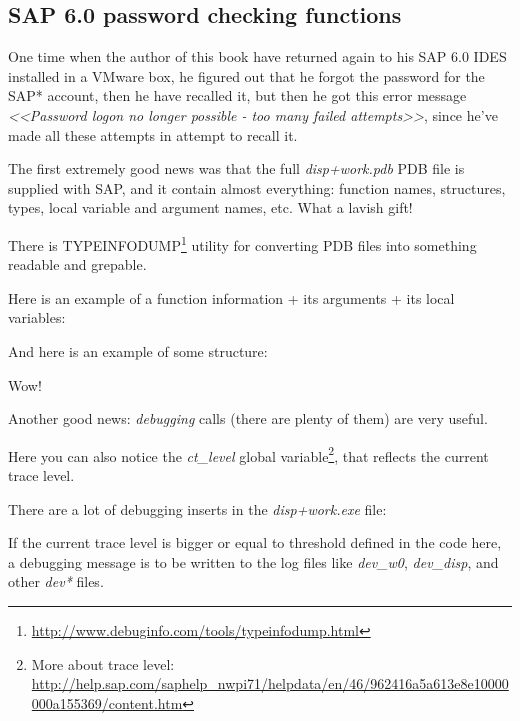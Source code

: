 \subsection{SAP 6.0 password checking functions}


One time when the author of this book have returned again to his SAP 6.0 IDES installed in a VMware box, he figured out that he forgot the password for the SAP* account, then he have recalled it, but then he got this error message 
\emph{<<Password logon no longer possible - too many failed attempts>>}, 
since he've made all these attempts in attempt to recall it.


The first extremely good news was that the full \emph{disp+work.pdb} \gls{PDB} file is supplied with SAP, and it contain almost everything: function names, structures, types, local variable and argument names, etc. What a lavish gift!

There is TYPEINFODUMP\footnote{\url{http://www.debuginfo.com/tools/typeinfodump.html}} utility for converting \gls{PDB} files into something readable and grepable.

Here is an example of a function information + its arguments + its local variables:



And here is an example of some structure:



Wow!

Another good news: \emph{debugging} calls (there are plenty of them) are very useful. 

Here you can also notice the \emph{ct\_level} global variable\footnote{More about trace level: \url{http://help.sap.com/saphelp_nwpi71/helpdata/en/46/962416a5a613e8e10000000a155369/content.htm}}, that reflects the current trace level.

There are a lot of debugging inserts in the \emph{disp+work.exe} file:



If the current trace level is bigger or equal to threshold defined in the code here, 
a debugging message is to be written to the log files like \emph{dev\_w0}, \emph{dev\_disp}, 
and other \emph{dev*} files.

\myindex{\GrepUsage}

